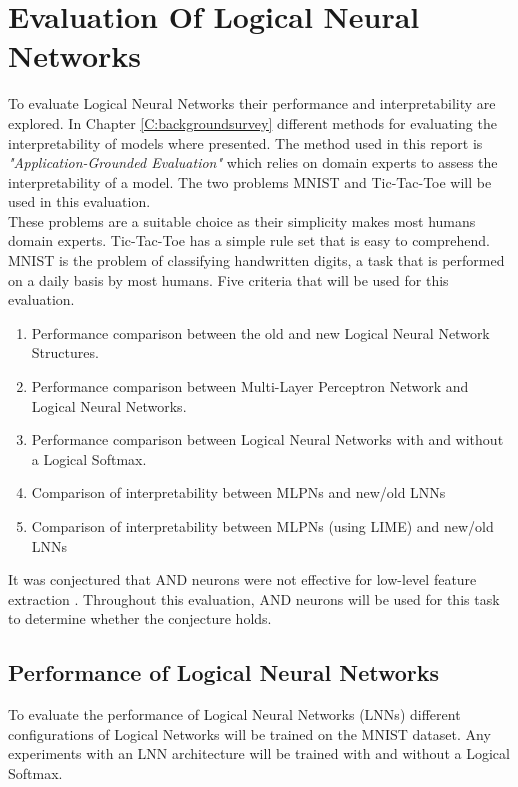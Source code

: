 \chapter{Evaluation Of Logical Neural Networks} \label{C:evaluation-lnn}
To evaluate Logical Neural Networks their performance and interpretability are explored. In Chapter \ref{C:backgroundsurvey} different methods for evaluating the interpretability of models where presented. The method used in this report is \textit{"Application-Grounded Evaluation"} \cite{doshi2017towards} which relies on domain experts to assess the interpretability of a model. The two problems MNIST \cite{mnistlecun} and Tic-Tac-Toe \cite{Lichman:2013} will be used in this evaluation.\\

These problems are a suitable choice as their simplicity makes most humans domain experts. Tic-Tac-Toe has a simple rule set that is easy to comprehend. MNIST is the problem of classifying handwritten digits, a task that is performed on a daily basis by most humans. Five criteria that will be used for this evaluation.

\begin{enumerate}
	\item Performance comparison between the old and new Logical Neural Network Structures.
	\item Performance comparison between Multi-Layer Perceptron Network and Logical Neural Networks.
	\item Performance comparison between Logical Neural Networks with and without a Logical Softmax.
	\item Comparison of interpretability between MLPNs and new/old LNNs
	\item Comparison of interpretability between MLPNs (using LIME) and new/old LNNs
\end{enumerate}

It was conjectured that AND neurons were not effective for low-level feature extraction \cite{LearningLogicalActivations}. Throughout this evaluation, AND neurons will be used for this task to determine whether the conjecture holds.


\section{Performance of Logical Neural Networks} \label{sec:lnn-eval-peformance}
To evaluate the performance of Logical Neural Networks (LNNs) different configurations of Logical Networks will be trained on the MNIST dataset. Any experiments with an LNN architecture will be trained with and without a Logical Softmax.

